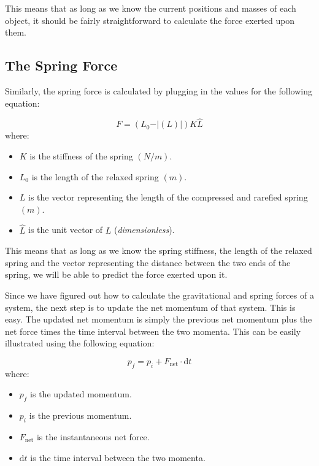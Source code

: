 \documentclass[11pt]{article}
\newcommand{\wrt}[1]{\mathrm{d}#1}
\begin{document}
This means that as long as we know the current positions and masses of each object, it should be fairly straightforward to calculate the force exerted upon them. 


\subsection{The Spring Force}

Similarly, the spring force is calculated by plugging in the values for the following equation:

\begin{equation}
    F = (L_0 - \vert(L)\vert) K \hat{L}
\end{equation}	where:

\begin{itemize}
    \item $K$ is the stiffness of the spring $(N/m)$.
    \item $L_0$ is the length of the relaxed spring $(m)$.
    \item $L$ is the vector representing the length of the compressed and rarefied spring $(m)$.
    \item $\hat{L}$ is the unit vector of $L$ (\textit{dimensionless}).
\end{itemize}


This means that as long as we know the spring stiffness, the length of the relaxed spring and the vector representing the distance between the two ends of the spring, we will be able to predict the force exerted upon it.

Since we have figured out how to calculate the gravitational and spring forces of a system, the next step is to update the net momentum of that system. This is easy. The updated net momentum is simply the previous net momentum plus the net force times the time interval between the two momenta. This can be easily illustrated using the following equation:

\begin{equation}
    p_f = p_i + F_\mathrm{net} \cdot\wrt{t}
\end{equation} where:

\begin{itemize}
    \item $p_f$ is the updated momentum.
    \item $p_i$ is the previous momentum.
    \item $F_\mathrm{net}$ is the instantaneous net force.
    \item $\wrt{t}$ is the time interval between the two momenta.
\end{itemize}
\end{document}
